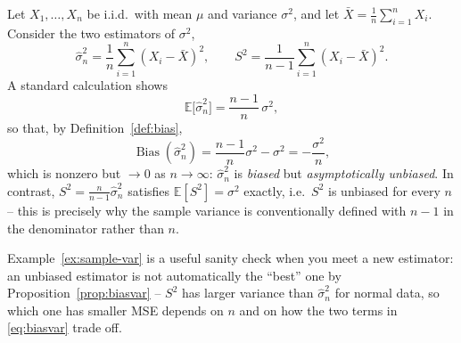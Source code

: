 \begin{example}
\label{ex:sample-var}
Let $X_1,\dots,X_n$ be i.i.d.\ with mean $\mu$ and variance $\sigma^2$,
and let $\bar X = \tfrac{1}{n}\sum_{i=1}^n X_i$. Consider the two
estimators of $\sigma^2$,
\begin{equation}
\label{eq:s2biased}
\hat\sigma^2_n = \frac{1}{n}\sum_{i=1}^n (X_i - \bar X)^2,
\qquad
S^2 = \frac{1}{n-1}\sum_{i=1}^n (X_i - \bar X)^2.
\end{equation}
A standard calculation shows
\begin{equation}
\label{eq:s2biased-mean}
\mathbb{E}\big[\hat\sigma^2_n\big] = \frac{n-1}{n}\,\sigma^2,
\end{equation}
so that, by Definition~\ref{def:bias},
\begin{equation}
\operatorname{Bias}(\hat\sigma^2_n) = \frac{n-1}{n}\sigma^2 - \sigma^2 = -\frac{\sigma^2}{n},
\end{equation}
which is nonzero but $\to 0$ as $n \to \infty$: $\hat\sigma^2_n$ is
\emph{biased} but \emph{asymptotically unbiased}. In contrast,
$S^2 = \tfrac{n}{n-1}\hat\sigma^2_n$ satisfies $\mathbb{E}[S^2] = \sigma^2$
exactly, i.e.\ $S^2$ is unbiased for every $n$ -- this is precisely why
the sample variance is conventionally defined with $n-1$ in the
denominator rather than $n$.
\end{example}

\begin{remark}
Example~\ref{ex:sample-var} is a useful sanity check when you meet a new
estimator: an unbiased estimator is not automatically the ``best'' one by
Proposition~\ref{prop:biasvar} -- $S^2$ has larger variance than
$\hat\sigma^2_n$ for normal data, so which one has smaller MSE depends on
$n$ and on how the two terms in \eqref{eq:biasvar} trade off.
\end{remark}
